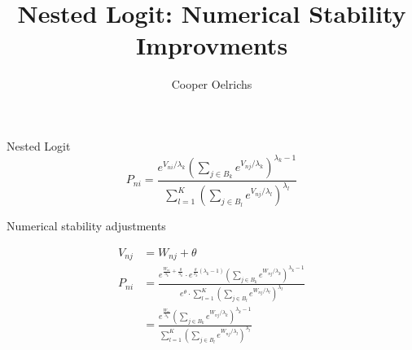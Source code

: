 \documentclass[20pt]{extarticle}
\begin{document}
\title{Nested Logit: Numerical Stability Improvments}
\author{Cooper Oelrichs}

Nested Logit
\[
  P_{ni}=
  \frac{e^{V_{ni}/\lambda_{k}}
  \left(\sum_{j\in B_{k}}e^{V_{nj}/\lambda_{k}}\right)
  ^{\lambda_{k}-1}}
  {\sum_{l=1}^{K}\left(\sum_{j\in B_{l}}
  e^{V_{nj}/\lambda_{l}}\right)^{\lambda_{l}}}
\]


Numerical stability adjustments

\begin{align}
  V_{nj} &= W_{nj} + \theta
  \\
  P_{ni} &=
  \frac{
    e^{ \frac{W_{ni}}{\lambda_{k}} + \frac{\theta}{\lambda_{k}} }
    \cdot
    e^{ \frac{\theta}{\lambda_{k}} (\lambda_{k}-1) }
    \left(\sum_{j\in B_{k}}e^{W_{nj}/\lambda_{k}}\right)
    ^{\lambda_{k}-1}
  }
  {
    e^\theta \cdot
    {\sum_{l=1}^{K}\left(\sum_{j\in B_{l}}
    e^{W_{nj}/\lambda_{l}}\right)^{\lambda_{l}}}
  }
  \\
  &= \frac{
      e^{ \frac{W_{ni}}{\lambda_{k}} }
      \left(\sum_{j\in B_{k}}e^{W_{nj}/\lambda_{k}}\right)
      ^{\lambda_{k}-1}
    }
    {
      {\sum_{l=1}^{K}\left(\sum_{j\in B_{l}}
      e^{W_{nj}/\lambda_{l}}\right)^{\lambda_{l}}}
    }
\end{align}
\end{document}
